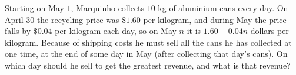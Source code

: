 Starting on May $1$, Marquinho collects $10$ kg of aluminium cans every day. On April $30$ the recycling price was $\$1.60$ per kilogram, and during May the price falls by $\$0.04$ per kilogram each day, so on May $n$ it is $1.60-0.04n$ dollars per kilogram. Because of shipping costs he must sell all the cans he has collected at one time, at the end of some day in May (after collecting that day's cans). On which day should he sell to get the greatest revenue, and what is that revenue?
